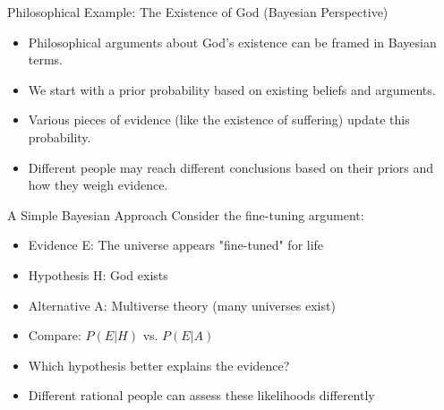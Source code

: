 \documentclass{beamer}
\begin{document}
	\begin{frame}{Philosophical Example: The Existence of God (Bayesian Perspective)}
		\begin{itemize}
			\small
			\item Philosophical arguments about God's existence can be framed in Bayesian terms.
			\item We start with a prior probability based on existing beliefs and arguments.
			\item Various pieces of evidence (like the existence of suffering) update this probability.
			\item Different people may reach different conclusions based on their priors and how they weigh evidence.
		\end{itemize}
		
		\begin{exampleblock}{A Simple Bayesian Approach}
			\scriptsize
			Consider the fine-tuning argument:
			\begin{itemize}
				\item Evidence E: The universe appears "fine-tuned" for life
				\item Hypothesis H: God exists
				\item Alternative A: Multiverse theory (many universes exist)
				\item Compare: $P(E|H)$ vs. $P(E|A)$
				\item Which hypothesis better explains the evidence?
				\item Different rational people can assess these likelihoods differently
			\end{itemize}
		\end{exampleblock}
	\end{frame}
	
\end{document}
